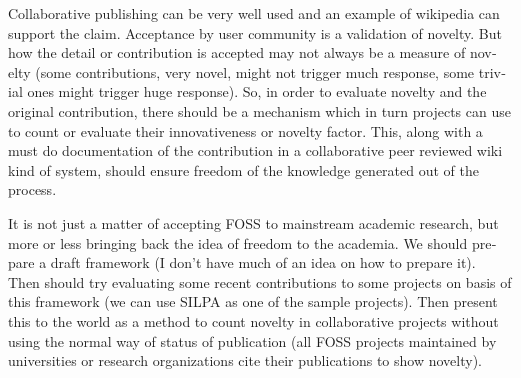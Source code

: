 \begin{english}
Collaborative publishing can be very well used and an example of wikipedia can support 
the claim. Acceptance by user community is a validation of novelty. But how the detail
or contribution is accepted may not always be a measure of novelty
(some contributions, very novel, might not trigger much response, some
trivial ones might trigger huge response). So, in order to evaluate novelty and the
original contribution, there should be a mechanism which in turn projects
can use to count or evaluate their innovativeness or novelty factor.
This, along with a must do documentation of the contribution in a collaborative
peer reviewed wiki kind of system, should ensure freedom of the knowledge
generated out of the process.

It is not just a matter of accepting FOSS to mainstream academic research, but 
more or less bringing back the idea of freedom to the academia. We should prepare 
a draft framework (I don't have much of an idea on how to prepare it). Then should try 
evaluating some recent contributions to some projects on basis of this framework (we can 
use SILPA as one of the sample projects). Then present this to the world as a method
to count novelty in collaborative projects without using the normal way of
status of publication (all FOSS projects maintained by universities or research
organizations cite their publications to show novelty).
\end{english}
\newpage
